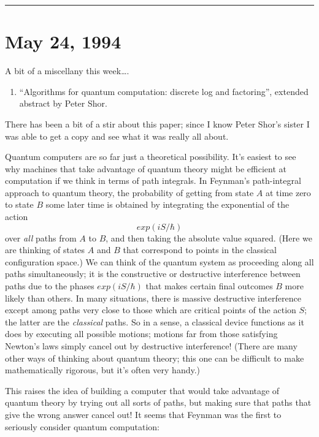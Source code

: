 \documentclass{article}
\def\tightlist{}
\begin{document}
\begin{center}\rule{0.5\linewidth}{0.5pt}\end{center}
\hypertarget{week34}{%
\section{May 24, 1994}\label{week34}}

A bit of a miscellany this week\ldots.

\begin{enumerate}
\def\labelenumi{\arabic{enumi})}
\tightlist
\item
  ``Algorithms for quantum computation: discrete log and factoring'',
  extended abstract by Peter Shor.
\end{enumerate}

There has been a bit of a stir about this paper; since I know Peter
Shor's sister I was able to get a copy and see what it was really all
about.

Quantum computers are so far just a theoretical possibility. It's
easiest to see why machines that take advantage of quantum theory might
be efficient at computation if we think in terms of path integrals. In
Feynman's path-integral approach to quantum theory, the probability of
getting from state \(A\) at time zero to state \(B\) some later time is
obtained by integrating the exponential of the action \[exp(iS/\hbar)\]
over \emph{all} paths from \(A\) to \(B\), and then taking the absolute
value squared. (Here we are thinking of states \(A\) and \(B\) that
correspond to points in the classical configuration space.) We can think
of the quantum system as proceeding along all paths simultaneously; it
is the constructive or destructive interference between paths due to the
phases \(exp(iS/\hbar)\) that makes certain final outcomes \(B\) more
likely than others. In many situations, there is massive destructive
interference except among paths very close to those which are critical
points of the action \(S\); the latter are the \emph{classical} paths.
So in a sense, a classical device functions as it does by executing all
possible motions; motions far from those satisfying Newton's laws simply
cancel out by destructive interference! (There are many other ways of
thinking about quantum theory; this one can be difficult to make
mathematically rigorous, but it's often very handy.)

This raises the idea of building a computer that would take advantage of
quantum theory by trying out all sorts of paths, but making sure that
paths that give the wrong answer cancel out! It seems that Feynman was
the first to seriously consider quantum computation:
\end{document}
